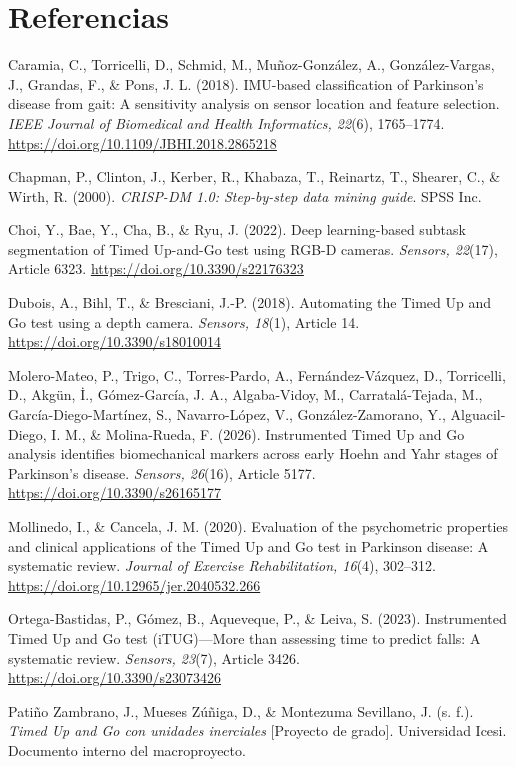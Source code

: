 \documentclass[12pt,a4paper]{article}
\newcommand{\seccionsinnumero}[1]{%
  \section*{#1}%
  \addcontentsline{toc}{section}{#1}%
}
\newenvironment{referencias}{%
  \setlength{\parindent}{0pt}%
  \setlength{\parskip}{8pt}%
  \begingroup\raggedright\small
}{\endgroup}
\newcommand{\refitem}[1]{\par\hangindent=1.25cm\hangafter=1 #1\par}
\begin{document}
\newpage
\seccionsinnumero{Referencias}

\begin{referencias}
\refitem{Caramia, C., Torricelli, D., Schmid, M., Muñoz-González, A., González-Vargas, J., Grandas, F., \& Pons, J. L. (2018). IMU-based classification of Parkinson's disease from gait: A sensitivity analysis on sensor location and feature selection. \emph{IEEE Journal of Biomedical and Health Informatics, 22}(6), 1765--1774. \url{https://doi.org/10.1109/JBHI.2018.2865218}}

\refitem{Chapman, P., Clinton, J., Kerber, R., Khabaza, T., Reinartz, T., Shearer, C., \& Wirth, R. (2000). \emph{CRISP-DM 1.0: Step-by-step data mining guide}. SPSS Inc.}

\refitem{Choi, Y., Bae, Y., Cha, B., \& Ryu, J. (2022). Deep learning-based subtask segmentation of Timed Up-and-Go test using RGB-D cameras. \emph{Sensors, 22}(17), Article 6323. \url{https://doi.org/10.3390/s22176323}}

\refitem{Dubois, A., Bihl, T., \& Bresciani, J.-P. (2018). Automating the Timed Up and Go test using a depth camera. \emph{Sensors, 18}(1), Article 14. \url{https://doi.org/10.3390/s18010014}}

\refitem{Molero-Mateo, P., Trigo, C., Torres-Pardo, A., Fernández-Vázquez, D., Torricelli, D., Akgün, İ., Gómez-García, J. A., Algaba-Vidoy, M., Carratalá-Tejada, M., García-Diego-Martínez, S., Navarro-López, V., González-Zamorano, Y., Alguacil-Diego, I. M., \& Molina-Rueda, F. (2026). Instrumented Timed Up and Go analysis identifies biomechanical markers across early Hoehn and Yahr stages of Parkinson's disease. \emph{Sensors, 26}(16), Article 5177. \url{https://doi.org/10.3390/s26165177}}

\refitem{Mollinedo, I., \& Cancela, J. M. (2020). Evaluation of the psychometric properties and clinical applications of the Timed Up and Go test in Parkinson disease: A systematic review. \emph{Journal of Exercise Rehabilitation, 16}(4), 302--312. \url{https://doi.org/10.12965/jer.2040532.266}}

\refitem{Ortega-Bastidas, P., Gómez, B., Aqueveque, P., \& Leiva, S. (2023). Instrumented Timed Up and Go test (iTUG)---More than assessing time to predict falls: A systematic review. \emph{Sensors, 23}(7), Article 3426. \url{https://doi.org/10.3390/s23073426}}

\refitem{Patiño Zambrano, J., Mueses Zúñiga, D., \& Montezuma Sevillano, J. (s. f.). \emph{Timed Up and Go con unidades inerciales} [Proyecto de grado]. Universidad Icesi. Documento interno del macroproyecto.}


\end{referencias}
\end{document}
